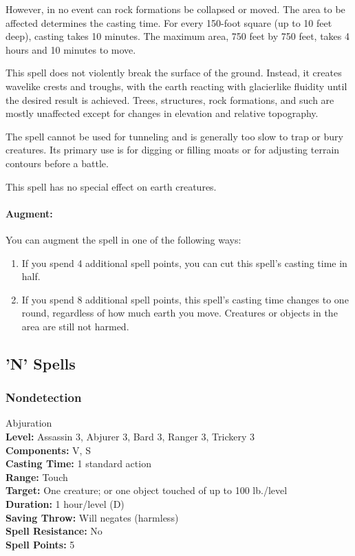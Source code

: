 However, in no event can rock formations be collapsed or moved. 
The area to be affected determines the casting time. For every 150-foot square (up to 10 feet deep), casting takes 10 minutes. 
The maximum area, 750 feet by 750 feet, takes 4 hours and 10 minutes to move.

This spell does not violently break the surface of the ground. 
Instead, it creates wavelike crests and troughs, with the earth reacting with glacierlike fluidity until the desired result is achieved. 
Trees, structures, rock formations, and such are mostly unaffected except for changes in elevation and relative topography.

The spell cannot be used for tunneling and is generally too slow to trap or bury creatures. 
Its primary use is for digging or filling moats or for adjusting terrain contours before a battle.

This spell has no special effect on earth creatures.

\paragraph{Augment:} You can augment the spell in one of the following ways:
\begin{enumerate}
 \item If you spend 4 additional spell points, you can cut this spell's casting time in half.
 \item If you spend 8 additional spell points, this spell's casting time changes to one round, regardless of how much earth you move. Creatures or objects in the area are still not harmed.
\end{enumerate}
\subsection{'N' Spells}
\subsubsection{Nondetection}
\label{Spell:Nondetection}
Abjuration
\\ \textbf{Level:} Assassin 3, Abjurer 3, Bard 3, Ranger 3, Trickery 3
\\ \textbf{Components:} V, S
\\ \textbf{Casting Time:} 1 standard action
\\ \textbf{Range:} Touch
\\ \textbf{Target:} One creature; or one object touched of up to 100 lb./level
\\ \textbf{Duration:} 1 hour/level (D)
\\ \textbf{Saving Throw:} Will negates (harmless)
\\ \textbf{Spell Resistance:} No
\\ \textbf{Spell Points:} 5

